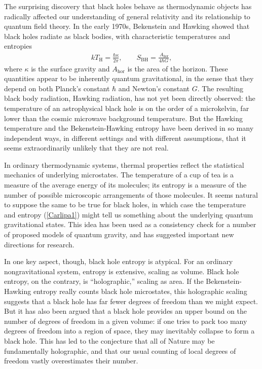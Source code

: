 \documentclass[12pt]{article}
\makeatletter
\def\section{\@startsection{section}{1}{\z@}{3.5ex plus 1ex minus
   .2ex}{2.3ex plus .2ex}{\large\bf}}
\makeatother
\begin{document}
\section{Introduction}
The surprising discovery that black holes behave as thermodynamic objects has 
radically affected our understanding of general relativity and its relationship to 
quantum field theory.  In the early 1970s, Bekenstein \cite{Bekb,Bekenstein} 
and Hawking \cite{Hawking,Hawkingc} showed that black
holes radiate as black bodies, with characteristic temperatures and entropies 
\begin{align}
kT_{\scriptscriptstyle\mathrm{H}} = \frac{\hbar\kappa}{2\pi} ,\qquad
S_{\scriptscriptstyle\mathrm{BH}}
 = \frac{\ A_{\mathrm{\scriptstyle hor}}}{4\hbar G}  ,
\label{Carlipa1}
\end{align}
where $\kappa$ is the surface gravity and $A_{\mathrm{\scriptstyle hor}}$
is the area of the horizon.  These quantities appear to be inherently quantum 
gravitational, in the sense that they depend on both Planck's
constant $\hbar$ and Newton's constant $G$.   The resulting black body radiation,
Hawking radiation, has not yet been directly observed: the temperature of
an astrophysical black hole is on the order of a microkelvin, far lower than
the cosmic microwave background temperature.  But the Hawking temperature and 
the Bekenstein-Hawking entropy have been derived in so many independent ways,
in different settings and with different assumptions, that it seems extraordinarily
unlikely that they are not real.

In ordinary thermodynamic systems, thermal properties reflect 
the statistical mechanics of underlying microstates.  The temperature of a cup of
tea is a measure of the average energy of its molecules; its entropy is a measure 
of the number of possible microscopic arrangements of those molecules.  It seems 
natural to suppose the same to be true for black holes, in which case the 
temperature and entropy (\ref{Carlipa1}) might tell us something about the 
underlying quantum gravitational states.  This idea has been used as a 
consistency check for a number of proposed models of quantum gravity,
and has suggested important new directions for research.  

In one key aspect, though, black hole entropy is atypical.  For an ordinary 
nongravitational system, entropy is extensive, scaling as volume.  Black 
hole entropy, on the contrary, is ``holographic,'' scaling as area.  If the 
Bekenstein-Hawking entropy really counts black hole microstates, this 
holographic scaling suggests that a black hole has far fewer degrees of 
freedom than we might expect.  But it has also been argued that a black 
hole provides an upper bound on the number of degrees of freedom in 
a given volume: if one tries to pack too many degrees of freedom into a 
region of space,  they may inevitably collapse to form a black hole.  This 
has led to the conjecture that all of Nature may be fundamentally 
holographic, and that our usual counting of local degrees of freedom 
vastly overestimates their number.
\end{document}
